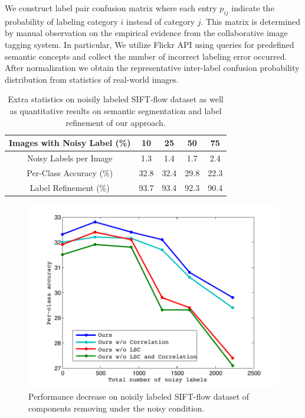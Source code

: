 We construct label pair confusion matrix where each entry $p_{ij}$ indicate the probability of labeling category $i$ instead of category $j$. This matrix is determined by manual observation on the empirical evidence from the collaborative image tagging system. In particular, We utilize Flickr API using queries for predefined semantic concepts and collect the number of incorrect labeling error occurred. After normalization we obtain the representative inter-label confusion probability distribution from statistics of real-world images.

\begin{table}[htb]
\begin{center}
\begin{tabular}{|c|c|c|c|c|}
\hline
Images with Noisy Label (\%) & 10 & 25 & 50 & 75 \\
\hline
Noisy Labels per Image & 1.3 & 1.4 & 1.7 & 2.4 \\
\hline
Per-Class Accuracy (\%) & 32.8 & 32.4 & 29.8 & 22.3 \\
\hline
Label Refinement (\%) & 93.7 & 93.4 & 92.3 & 90.4 \\
\hline
\end{tabular}
\end{center}
\caption{Extra statistics on noisily labeled SIFT-flow dataset as well as quantitative results on semantic segmentation and label refinement of our approach.}
\label{tab:ExpNoise}
\vspace{-3mm}
\end{table}

\begin{figure}[htb]
\begin{center}
    \includegraphics[width=1\linewidth]{fig_noisylabel.pdf}
\end{center}
\vspace{-3mm}
\caption{Performance decrease on noisily labeled SIFT-flow dataset of components removing under the noisy condition.}
\label{fig:noisyexp}
\end{figure}

